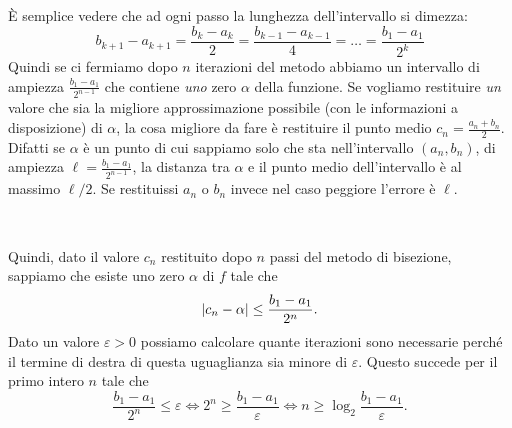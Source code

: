 \documentclass[a4paper]{report}
\DeclarePairedDelimiter{\abs}{\lvert}{\rvert}
\theoremstyle{definiton}
\theoremstyle{remark}
\begin{document}
È semplice vedere che ad ogni passo la lunghezza dell'intervallo si dimezza:
\[
b_{k+1} - a_{k+1} = \frac{b_{k} - a_{k}}{2} = \frac{b_{k-1} - a_{k-1}}{4} = \dots = \frac{b_{1} - a_{1}}{2^k}
\]
Quindi se ci fermiamo dopo $n$ iterazioni del metodo abbiamo un intervallo di ampiezza $\frac{b_1-a_1}{2^{n-1}}$ che contiene \emph{uno} zero $\alpha$ della funzione. Se vogliamo restituire \emph{un} valore che sia la migliore approssimazione possibile (con le informazioni a disposizione) di $\alpha$, la cosa migliore da fare è restituire il punto medio $c_n = \frac{a_n + b_n}{2}$. Difatti se $\alpha$ è un punto di cui sappiamo solo che sta nell'intervallo $(a_n,b_n)$, di ampiezza $\ell = \frac{b_1-a_1}{2^{n-1}}$, la distanza tra $\alpha$ e il punto medio dell'intervallo è al massimo $\ell/2$. Se restituissi $a_n$ o $b_n$ invece nel caso peggiore l'errore è $\ell$.
\begin{center}
    \\
\end{center}

Quindi, dato il valore $c_n$ restituito dopo $n$ passi del metodo di bisezione, sappiamo che esiste uno zero $\alpha$ di $f$ tale che 
\[
\abs{c_n - \alpha} \leq \frac{b_1-a_1}{2^{n}}.
\]
Dato un valore $\varepsilon > 0$ possiamo calcolare quante iterazioni sono necessarie perché il termine di destra di questa uguaglianza sia minore di $\varepsilon$. Questo succede per il primo intero $n$ tale che
\[
\frac{b_1 - a_1}{2^n} \leq \varepsilon \iff 2^n \geq \frac{b_1 - a_1}{\varepsilon} \iff n \geq \log_2 \frac{b_1 - a_1}{\varepsilon}.
\]
\end{document}
